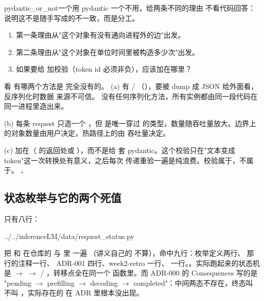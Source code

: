 \begin{checkpoint}{pydantic_or_not}{一个用 pydantic 一个不用，给两条不同的理由}
不看代码回答：说明这不是随手写成的不一致，而是分工。
\begin{enumerate}[label=(\alph*)]
  \item 第一条理由从"这个对象有没有通向进程外的边"出发。
  \item 第二条理由从"这个对象在单位时间里被构造多少次"出发。
  \item 如果要给  加校验（token id 必须非负），应该加在哪里？
\end{enumerate}
\hint 看  有哪两个方法是  完全没有的。
\ifshowanswers
\tcblower
\answer (a)  有  / 
（），要被 dump 成 JSON 给外面看，反序列化时数据
来源不可信。 没有任何序列化方法，所有实例都由同一段代码在同一进程里造出来。

(b) 每条 request 只造一个 ，但  是唯一穿过
 的类型，数量随吞吐量放大。边界上的对象数量由用户决定，热路径上的由
吞吐量决定。

(c) 加在（ 的返回处或
），而不是给
 套 pydantic。这个校验只在"文本变成 token"这一次转换处有意义，之后每次
传递重验一遍是纯浪费。校验属于，不属于。
\whereincode {}、
\fi
\end{checkpoint}

\subsection{状态枚举与它的两个死值}
\label{sec:a-shape-dead-enum}

 只有八行：

%
  {../../inferenceLM/data/request_status.py}

把  和  在仓库的  与  里  一遍
（讲义自己的  不算），命中九行：枚举定义两行、 那行的注释一行、
ADR-001 四行、week2-retro 一行、 一行。。实际跑起来的状态机
是  $\to$  $\to$  / ，转移点全在同一个
函数里。而 ADR-000 的 Consequences 写的是 "pending $\to$ prefilling $\to$ decoding $\to$
completed"：中间两态不存在，终态叫  不叫 ，实际存在的
 在 ADR 里根本没出现。

